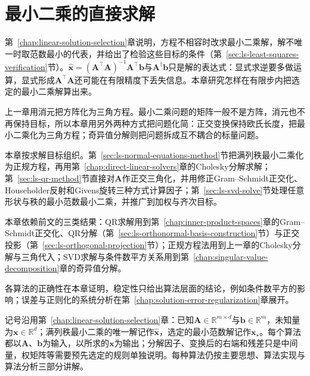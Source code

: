 \chapter{最小二乘的直接求解}
\label{chap:direct-least-squares-solvers}

第~\ref{chap:linear-solution-selection}章说明，方程不相容时改求最小二乘解，解不唯一时取范数最小的代表，并给出了检验这些目标的条件（第~\ref{sec:ls-least-squares-verification}节）。$\hat{\bm x}=(\bm A^\top\bm A)^{-1}\bm A^\top\bm b$与$\bm A^\dagger\bm b$只是解的表达式：显式求逆要多做运算，显式形成$\bm A^\top\bm A$还可能在有限精度下丢失信息。本章研究怎样在有限步内把选定的最小二乘解算出来。

上一章用消元把方阵化为三角方程。最小二乘问题的矩阵一般不是方阵，消元也不再保持目标，所以本章用另外两种方式把问题化简：正交变换保持欧氏长度，把最小二乘化为三角方程；奇异值分解则把问题拆成互不耦合的标量问题。

本章按求解目标组织。第~\ref{sec:ls-normal-equations-method}节把满列秩最小二乘化为正规方程，再用第~\ref{chap:direct-linear-solvers}章的Cholesky分解求解；第~\ref{sec:ls-qr-method}节直接对$\bm A$作正交三角化，并用修正Gram--Schmidt正交化、Householder反射和Givens旋转三种方式计算因子；第~\ref{sec:ls-svd-solve}节处理任意形状与秩的最小范数最小二乘，并推广到加权与齐次目标。

本章依赖前文的三类结果：QR求解用到第~\ref{chap:inner-product-spaces}章的Gram--Schmidt正交化、QR分解（第~\ref{sec:ls-orthonormal-basis-construction}节）与正交投影（第~\ref{sec:ls-orthogonal-projection}节）；正规方程法用到上一章的Cholesky分解与三角代入；SVD求解与条件数平方关系用到第~\ref{chap:singular-value-decomposition}章的奇异值分解。

各算法的正确性在本章证明，稳定性只给出算法层面的结论，例如条件数平方的影响；误差与正则化的系统分析在第~\ref{chap:solution-error-regularization}章展开。

记号沿用第~\ref{chap:linear-solution-selection}章：已知$\bm A\in\mathbb R^{m\times d}$与$\bm b\in\mathbb R^m$，未知量为$\bm x\in\mathbb R^d$；满列秩最小二乘的唯一解记作$\hat{\bm x}$，选定的最小范数解记作$\bm x_\star$。每个算法都以$\bm A$、$\bm b$为输入，以所求的$\bm x$为输出；分解因子、变换后的右端和残差只是中间量，权矩阵等需要预先选定的规则单独说明。每种算法仍按主要思想、算法实现与算法分析三部分讲解。



